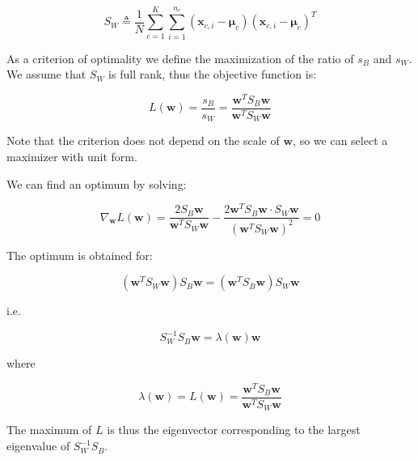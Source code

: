 \begin{equation*}
S_W \triangleq \frac{1}{N}\sum_{c=1}^{K} \sum_{i=1}^{n_c} (\mathbf{x}_{c,i} - \boldsymbol{\mu}_c)(\mathbf{x}_{c,i} - \boldsymbol{\mu}_c)^T
\end{equation*}

As a criterion of optimality we define the maximization of the ratio of $s_B$ and $s_W$. We assume that $S_W$ is full rank, thus the objective function is:

\begin{equation*}
L(\mathbf{w}) = \frac{s_B}{s_W} = \frac{\mathbf{w}^T S_B \mathbf{w}}{\mathbf{w}^T S_W \mathbf{w}}
\end{equation*}

Note that the criterion does not depend on the scale of $\mathbf{w}$, so we can select a maximizer with unit form.

We can find an optimum by solving:

\begin{equation*}
\nabla_{\mathbf{w}} L(\mathbf{w}) = \frac{2S_B\mathbf{w}}{\mathbf{w}^T S_W \mathbf{w}} - \frac{2\mathbf{w}^T S_B \mathbf{w} \cdot S_W \mathbf{w}}{(\mathbf{w}^T S_W \mathbf{w})^2} = 0
\end{equation*}

The optimum is obtained for:

\begin{equation*}
(\mathbf{w}^T S_W \mathbf{w})S_B\mathbf{w} = (\mathbf{w}^T S_B \mathbf{w})S_W\mathbf{w}
\end{equation*}

i.e.

\begin{equation*}
S_W^{-1}S_B\mathbf{w} = \lambda(\mathbf{w})\mathbf{w}
\end{equation*}

where

\begin{equation*}
\lambda(\mathbf{w}) = L(\mathbf{w}) = \frac{\mathbf{w}^T S_B \mathbf{w}}{\mathbf{w}^T S_W \mathbf{w}}
\end{equation*}

The maximum of $L$ is thus the eigenvector corresponding to the largest eigenvalue of $S_W^{-1}S_B$.


